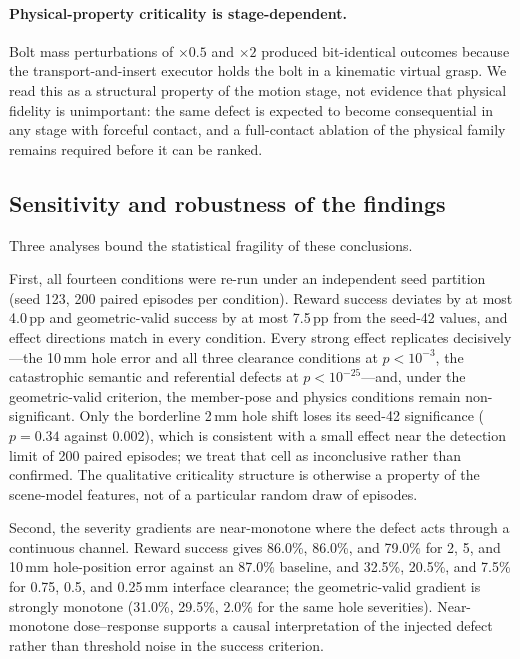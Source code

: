 \paragraph{Physical-property criticality is stage-dependent.} Bolt mass
perturbations of $\times0.5$ and $\times2$ produced bit-identical outcomes
because the transport-and-insert executor holds the bolt in a kinematic
virtual grasp. We read this as a structural property of the motion stage, not
evidence that physical fidelity is unimportant: the same defect is expected to
become consequential in any stage with forceful contact, and a full-contact
ablation of the physical family remains required before it can be ranked.

\subsection{Sensitivity and robustness of the findings}
\label{sec:sensitivity}

Three analyses bound the statistical fragility of these conclusions.

First, all fourteen conditions were re-run under an independent seed
partition (seed 123, 200 paired episodes per condition). Reward success
deviates by at most 4.0\,pp and geometric-valid success by at most 7.5\,pp
from the seed-42 values, and effect directions match in every condition.
Every strong effect replicates decisively---the 10\,mm hole error and all
three clearance conditions at $p<10^{-3}$, the catastrophic semantic and
referential defects at $p<10^{-25}$---and, under the geometric-valid
criterion, the member-pose and physics conditions remain non-significant. Only the borderline 2\,mm hole shift
loses its seed-42 significance ($p=0.34$ against $0.002$), which is
consistent with a small effect near the detection limit of 200 paired
episodes; we treat that cell as inconclusive rather than confirmed. The
qualitative criticality structure is otherwise a property of the scene-model
features, not of a particular random draw of episodes.

Second, the severity gradients are near-monotone where the defect acts
through a continuous channel. Reward success gives 86.0\%, 86.0\%, and
79.0\% for 2, 5, and 10\,mm hole-position error against an 87.0\% baseline,
and 32.5\%, 20.5\%, and 7.5\% for 0.75, 0.5, and 0.25\,mm interface
clearance; the geometric-valid gradient is strongly monotone (31.0\%,
29.5\%, 2.0\% for the same hole severities). Near-monotone dose--response
supports a causal interpretation of the injected defect rather than
threshold noise in the success criterion.

